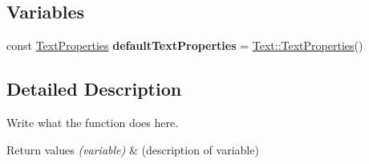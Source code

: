\subsection*{Variables}
\begin{DoxyCompactItemize}
\item 
\hypertarget{namespaceText_a074c44595a1036ca6d8b6f7255bf0b75}{const \hyperlink{structText_1_1TextProperties}{Text\+Properties} {\bfseries default\+Text\+Properties} = \hyperlink{structText_1_1TextProperties}{Text\+::\+Text\+Properties}()}\label{namespaceText_a074c44595a1036ca6d8b6f7255bf0b75}

\end{DoxyCompactItemize}


\subsection{Detailed Description}
Write what the function does here. 


\begin{DoxyRetVals}{Return values}
{\em (variable)} & (description of variable) \\
\hline
\end{DoxyRetVals}
